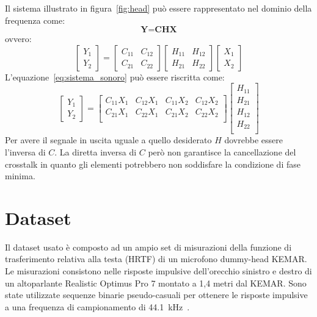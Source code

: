 \documentclass[12pt,a4paper,titlepage]{article}
\begin{document}
Il sistema illustrato in figura~\ref{fig:head} può essere rappresentato nel dominio della frequenza come:
\begin{equation}\label{eq:Y=CHX}
\textbf{Y} = \textbf{CHX}
\end{equation}
ovvero:
\begin{equation}\label{eq:sistema_sonoro}
\begin{bmatrix}
Y_1\\
Y_2
\end{bmatrix}
=
\begin{bmatrix}
C_{11} & C_{12}\\
C_{21} & C_{22}
\end{bmatrix}
\begin{bmatrix}
H_{11} & H_{12}\\
H_{21} & H_{22}
\end{bmatrix}
\begin{bmatrix}
X_1\\
X_2
\end{bmatrix}
\end{equation}
L'equazione~\eqref{eq:sistema_sonoro} può essere riscritta come:
\begin{equation}
\begin{bmatrix}
Y_1\\
Y_2
\end{bmatrix}
=
\begin{bmatrix}
C_{11} X_1 & C_{12} X_1 & C_{11} X_2 & C_{12} X_2 \\ 
C_{21} X_1 & C_{22} X_1 & C_{21} X_2 & C_{22} X_2 \\ 
\end{bmatrix}
\begin{bmatrix}
H_{11}\\
H_{21}\\
H_{12}\\
H_{22}\\
\end{bmatrix}
\end{equation}
Per avere il segnale in uscita uguale a quello desiderato $H$ dovrebbe essere l'inversa di $C$. La diretta inversa di $C$ però non garantisce la cancellazione del crosstalk in quanto gli elementi potrebbero non soddisfare la condizione di fase minima. 
\clearpage

\section{Dataset}
\label{sec:Dataset}
Il dataset usato è composto ad un ampio set di misurazioni della funzione di trasferimento relativa alla testa (HRTF) di un microfono dummy-head KEMAR. Le misurazioni consistono nelle risposte impulsive dell'orecchio sinistro e destro di un altoparlante Realistic Optimus Pro 7 montato a 1,4 metri dal KEMAR. Sono state utilizzate sequenze binarie pseudo-casuali per ottenere le risposte impulsive a una frequenza di campionamento di \SI{44.1}{\kilo \hertz}~\cite{Gardner:HRTF}. 
\end{document}
